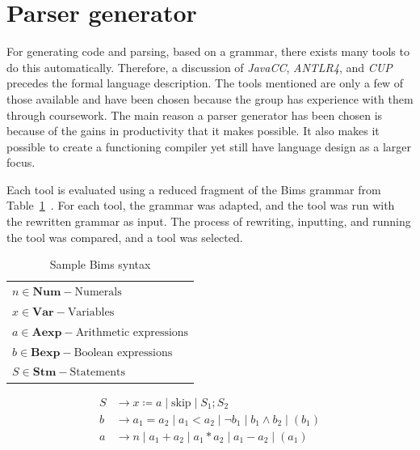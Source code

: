 \section{Parser generator}\label{sec:parsergenerator}
For generating code and parsing, based on a grammar, there exists many tools to do this automatically.
Therefore, a discussion of \textit{JavaCC}, \textit{ANTLR4}, and \textit{CUP} precedes the formal language description. The tools mentioned are only a few of those available and have been chosen because the group has experience with them through coursework.  The main reason a parser generator has been chosen is because of the gains in productivity that it makes possible. It also makes it possible to create a functioning compiler yet still have language design as a larger focus.

Each tool is evaluated using a reduced fragment of the Bims grammar from Table~\ref{tab:bimsgrammar}~\cite{Huttel2010}. For each tool, the grammar was adapted, and the tool was run with the rewritten grammar as input. The process of rewriting, inputting, and running the tool was compared, and a tool was selected.


\begin{table}[htb!]
  \centering
  \begin{tabular}{l}
    $n \in \textbf{Num} - \text{Numerals}$                \\
    $x \in \textbf{Var} - \text{Variables}$               \\
    $a \in \textbf{Aexp} - \text{Arithmetic expressions}$ \\
    $b \in \textbf{Bexp} - \text{Boolean expressions}$    \\
    $S \in \textbf{Stm} - \text{Statements}$              \\
  \end{tabular}
  \begin{align*}
    S & \rightarrow x \coloneqq a \mid \text{skip} \mid S_1;S_2                          \\
    b & \rightarrow a_1 = a_2 \mid a_1 < a_2 \mid \neg b_1 \mid b_1 \land b_2 \mid (b_1) \\
    a & \rightarrow n \mid a_1 + a_2 \mid a_1 * a_2 \mid a_1 - a_2 \mid (a_1)
  \end{align*}
  \caption{Sample Bims syntax \cite{Huttel2010}}
  \label{tab:bimsgrammar}
\end{table}


